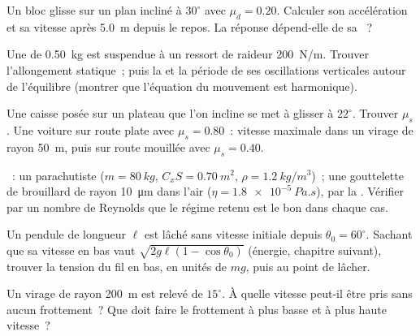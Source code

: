 \begin{exercise}[$\star$]\label{exo:b1:newton-dynamics:3}
Un bloc glisse sur un plan incliné à $30^\circ$ avec $\mu_d = 0.20$.
Calculer son accélération et sa vitesse après \qty{5.0}{m} depuis le
repos. La réponse dépend-elle de sa ~?
\end{exercise}

\begin{exercise}[$\star$]\label{exo:b1:newton-dynamics:4}
Une  de \qty{0.50}{kg} est suspendue à un ressort de raideur
\qty{200}{N/m}. Trouver l'allongement statique~; puis la  et la
période de ses oscillations verticales autour de l'équilibre (montrer
que l'équation du mouvement est harmonique).
\end{exercise}

\begin{exercise}[$\star\star$]\label{exo:b1:newton-dynamics:5}
Une caisse posée sur un plateau que l'on incline se met à glisser à
$22^\circ$. Trouver $\mu_s$. Une voiture sur route plate avec
$\mu_s = 0.80$~: vitesse maximale dans un virage de rayon \qty{50}{m},
puis sur route mouillée avec $\mu_s = 0.40$.
\end{exercise}

\begin{exercise}[$\star\star$]\label{exo:b1:newton-dynamics:6}
~: un parachutiste ($m = \qty{80}{kg}$, $C_xS = \qty{0.70}{m^2}$,
$\rho = \qty{1.2}{kg/m^3}$)~; une gouttelette de brouillard de rayon
\qty{10}{\micro m} dans l'air ($\eta = \qty{1.8e-5}{Pa.s}$), par la . Vérifier par un nombre de Reynolds que le régime retenu est
le bon dans chaque cas.
\end{exercise}

\begin{exercise}[$\star\star$]\label{exo:b1:newton-dynamics:7}
Un pendule de longueur $\ell$ est lâché sans vitesse initiale depuis
$\theta_0 = 60^\circ$. Sachant que sa vitesse en bas vaut
$\sqrt{2g\ell(1 - \cos\theta_0)}$ (énergie, chapitre suivant), trouver
la tension du fil en bas, en unités de $mg$, puis au point de lâcher.
\end{exercise}

\begin{exercise}[$\star\star$]\label{exo:b1:newton-dynamics:8}
Un virage de rayon \qty{200}{m} est relevé de $15^\circ$. À quelle
vitesse peut-il être pris sans aucun frottement~? Que doit faire le
frottement à plus basse et à plus haute vitesse~?
\end{exercise}

